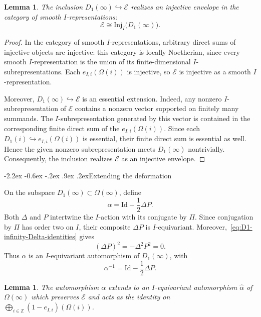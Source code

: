 \documentclass[10pt]{article}
\makeatletter
\renewcommand\subsection{\@startsection{subsection}{2}{\z@}%
  {-2.2ex \@plus -0.6ex \@minus -.2ex}%
  {.9ex \@plus .2ex}{\normalfont\large\bfseries}}
\theoremstyle{plain}
\newtheorem{lemma}[theorem]{Lemma}
\theoremstyle{definition}
\theoremstyle{remark}
\newcommand{\Inj}{\mathrm{Inj}}
\newcommand{\Id}{\mathrm{Id}}
\makeatother
\begin{document}
\begin{lemma}\label{lem:calE-injective-envelope}
The inclusion $D_1(\infty)\hookrightarrow\mathcal E$ realizes an injective envelope in the category of smooth $I$-representations:
\begin{equation}\label{eq:calE-injective-envelope}
\mathcal E\cong\Inj_I\bigl(D_1(\infty)\bigr).
\end{equation}
\end{lemma}

\begin{proof}
In the category of smooth $I$-representations, arbitrary direct sums of injective objects are injective: this category is locally Noetherian, since every smooth $I$-representation is the union of its finite-dimensional $I$-subrepresentations. Each $e_{I,i}(\Omega(i))$ is injective, so $\mathcal E$ is injective as a smooth $I$-representation.

Moreover, $D_1(\infty)\hookrightarrow\mathcal E$ is an essential extension. Indeed, any nonzero $I$-subrepresentation of $\mathcal E$ contains a nonzero vector supported on finitely many summands. The $I$-subrepresentation generated by this vector is contained in the corresponding finite direct sum of the $e_{I,i}(\Omega(i))$. Since each $D_1(i)\hookrightarrow e_{I,i}(\Omega(i))$ is essential, their finite direct sum is essential as well. Hence the given nonzero subrepresentation meets $D_1(\infty)$ nontrivially. Consequently, the inclusion realizes $\mathcal E$ as an injective envelope.
\end{proof}

\subsection{Extending the deformation}

On the subspace $D_1(\infty)\subset\Omega(\infty)$, define
\begin{equation}\label{eq:D1-infinity-conjugating-automorphism}
\alpha=\Id+\frac12\Delta P.
\end{equation}
Both $\Delta$ and $P$ intertwine the $I$-action with its conjugate by $\Pi$. Since conjugation by $\Pi$ has order two on $I$, their composite $\Delta P$ is $I$-equivariant. Moreover,~\eqref{eq:D1-infinity-Delta-identities} gives
\[
(\Delta P)^2=-\Delta^2P^2=0.
\]
Thus $\alpha$ is an $I$-equivariant automorphism of $D_1(\infty)$, with
\[
\alpha^{-1}=\Id-\frac12\Delta P.
\]

\begin{lemma}\label{lem:conjugating-automorphism-extension}
The automorphism $\alpha$ extends to an $I$-equivariant automorphism $\widehat\alpha$ of $\Omega(\infty)$ which preserves $\mathcal E$ and acts as the identity on $\bigoplus_{i\in\mathbb{Z}}(1-e_{I,i})(\Omega(i))$.
\end{lemma}
\end{document}
